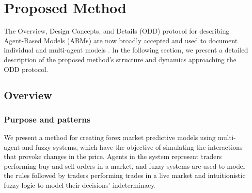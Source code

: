 \documentclass{ieeeaccess}
\begin{document}

\section{Proposed Method}
\label{section:proposed-method}

The Overview, Design Concepts, and Details (ODD) protocol for describing Agent-Based Models (ABMs) are now broadly accepted and used to document individual and multi-agent models \cite{Grimm2020}. In the following section, we present a detailed description of the proposed method's structure and dynamics approaching the ODD protocol.     



\subsection{Overview}
\label{subsection:overview}

\subsubsection{Purpose and patterns}
\label{subsubsection:purpose-and-patterns}
We present a method for creating forex market predictive models using multi-agent and fuzzy systems, which have the objective of simulating the interactions that provoke changes in the price. Agents in the system represent traders performing buy and sell orders in a market, and fuzzy systems are used to model the rules followed by traders performing trades in a live market and intuitionistic fuzzy logic to model their decisions' indeterminacy.
\end{document}
